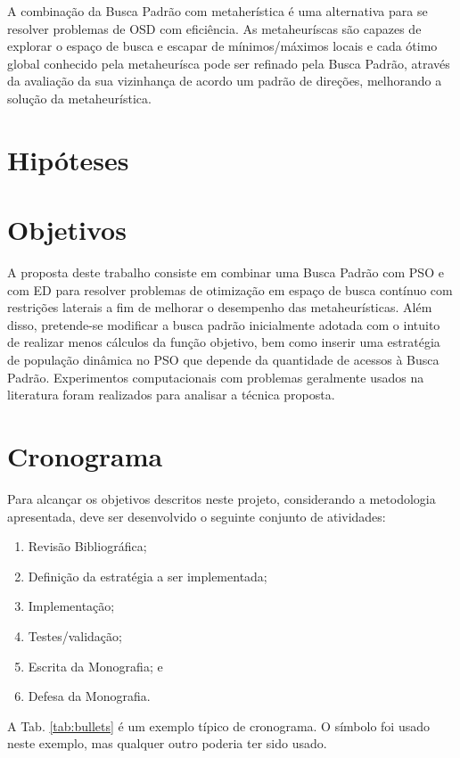 \documentclass[a4paper,12pt]{monografia}
\theoremstyle{plain}
\theoremstyle{definition}
\theoremstyle{remark}
\begin{document}
A combinação da Busca Padrão com metaherística é uma alternativa para se resolver problemas de OSD com eficiência. As metaheuríscas são capazes de explorar o espaço de busca e escapar de mínimos/máximos locais e cada ótimo global conhecido pela metaheurísca pode ser refinado pela Busca Padrão, através da avaliação da sua vizinhança de acordo um padrão de direções, melhorando a solução da metaheurística.

\section{Hipóteses} %
\section{Objetivos} %
A proposta deste trabalho consiste em combinar uma Busca Padrão com PSO e com ED para resolver
problemas de otimização em espaço de busca contínuo com restrições laterais a fim de melhorar o desempenho das metaheurísticas. Além disso, pretende-se modificar a busca padrão inicialmente adotada com o intuito de realizar menos cálculos da função objetivo, bem como inserir uma estratégia de população dinâmica no PSO que
depende da quantidade de acessos à Busca Padrão. Experimentos computacionais com
problemas geralmente usados na literatura foram realizados para analisar a técnica proposta.


\section{Cronograma}

Para alcançar os objetivos descritos neste projeto, considerando a metodologia apresentada, deve ser desenvolvido o seguinte conjunto de atividades:

\begin{enumerate}
\item Revisão Bibliográfica;
\item Definição da estratégia a ser implementada;
\item Implementação;
\item Testes/validação;
\item Escrita da Monografia; e
\item Defesa da Monografia.
\end{enumerate}

A Tab. \ref{tab:bullets}  é um exemplo típico de cronograma. O símbolo
 foi usado neste exemplo, mas qualquer outro poderia ter sido
usado.
\end{document}
